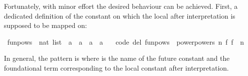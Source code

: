 \begin{isabellebody}
\begin{isamarkuptext}
  Fortunately, with minor effort the desired behaviour can be
  achieved.  First, a dedicated definition of the constant on which
  the local  after interpretation is supposed to be
  mapped on:%
\end{isamarkuptext}%
\isamarkuptrue%
%
\isadelimquote
%
\endisadelimquote
%
\isatagquote
{}\isamarkupfalse%
\ funpows\ {}{}\ {}nat\ list\ {}\ {}{}a\ {}\ {}a{}\ {}\ {}a\ {}\ {}a{}\ \isanewline
\ \ {}code\ del{}{}\ {}funpows\ {}\ power{}powers\ {}{}n\ f{}\ f\ {}{}\ n{}{}%
\endisatagquote
{\isafoldquote}%
%
\isadelimquote
%
\endisadelimquote
%
\begin{isamarkuptext}%
\noindent In general, the pattern is  where 
  is the name of the future constant and  the foundational
  term corresponding to the local constant after interpretation.


\end{isamarkuptext}
\end{isabellebody}
